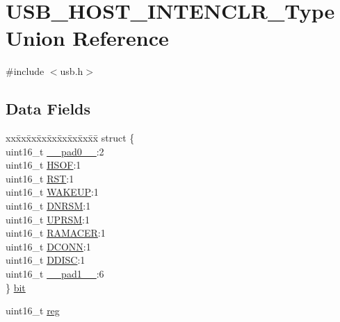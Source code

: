 \hypertarget{union_u_s_b___h_o_s_t___i_n_t_e_n_c_l_r___type}{}\section{U\+S\+B\+\_\+\+H\+O\+S\+T\+\_\+\+I\+N\+T\+E\+N\+C\+L\+R\+\_\+\+Type Union Reference}
\label{union_u_s_b___h_o_s_t___i_n_t_e_n_c_l_r___type}


{\ttfamily \#include $<$usb.\+h$>$}

\subsection*{Data Fields}
\begin{DoxyCompactItemize}
\item 
\begin{tabbing}
xx\=xx\=xx\=xx\=xx\=xx\=xx\=xx\=xx\=\kill
struct \{\\
\>uint16\_t \mbox{\hyperlink{union_u_s_b___h_o_s_t___i_n_t_e_n_c_l_r___type_a77132c2c26a75f5b8751b235cda23828}{\_\_pad0\_\_}}:2\\
\>uint16\_t \mbox{\hyperlink{union_u_s_b___h_o_s_t___i_n_t_e_n_c_l_r___type_a7f8340840d46e445277a0f7de01eef32}{HSOF}}:1\\
\>uint16\_t \mbox{\hyperlink{union_u_s_b___h_o_s_t___i_n_t_e_n_c_l_r___type_abef8327bfd071009d10633030379e701}{RST}}:1\\
\>uint16\_t \mbox{\hyperlink{union_u_s_b___h_o_s_t___i_n_t_e_n_c_l_r___type_a8daebdfb4a00acfdbe16023d636e3887}{WAKEUP}}:1\\
\>uint16\_t \mbox{\hyperlink{union_u_s_b___h_o_s_t___i_n_t_e_n_c_l_r___type_ab69050f1de488116f29c04177bb64953}{DNRSM}}:1\\
\>uint16\_t \mbox{\hyperlink{union_u_s_b___h_o_s_t___i_n_t_e_n_c_l_r___type_a21d16bc73d976e53f035b7dd20e1160b}{UPRSM}}:1\\
\>uint16\_t \mbox{\hyperlink{union_u_s_b___h_o_s_t___i_n_t_e_n_c_l_r___type_a0391330e7e210b908b26fec3fe07622f}{RAMACER}}:1\\
\>uint16\_t \mbox{\hyperlink{union_u_s_b___h_o_s_t___i_n_t_e_n_c_l_r___type_a8b0d608359caac0545b9a34e9eb09370}{DCONN}}:1\\
\>uint16\_t \mbox{\hyperlink{union_u_s_b___h_o_s_t___i_n_t_e_n_c_l_r___type_abc0acd8a4414aca610fd40d2a08cbb94}{DDISC}}:1\\
\>uint16\_t \mbox{\hyperlink{union_u_s_b___h_o_s_t___i_n_t_e_n_c_l_r___type_ab72e3a1f2f7db8695c60c658f5a0f11a}{\_\_pad1\_\_}}:6\\
\} \mbox{\hyperlink{union_u_s_b___h_o_s_t___i_n_t_e_n_c_l_r___type_a7dd96919ea898d0a7202576d290d4d0f}{bit}}\\

\end{tabbing}\item 
uint16\+\_\+t \mbox{\hyperlink{union_u_s_b___h_o_s_t___i_n_t_e_n_c_l_r___type_a11760f5020019f4aa8cb02e694f7cc44}{reg}}
\end{DoxyCompactItemize}


